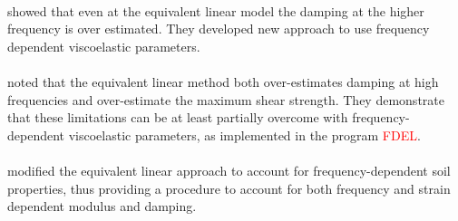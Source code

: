 \\
\citet{Kausel2002} showed that even at the equivalent linear model the damping at the higher frequency is over estimated. They developed new approach to use frequency dependent viscoelastic parameters.\\
\\
\citet{Yoshida2002} noted that the equivalent linear method both over-estimates damping at high frequencies and over-estimate the maximum shear strength. They demonstrate that these limitations can be at least partially overcome with frequency-dependent viscoelastic parameters, as implemented in the program \textcolor{red}{FDEL}.\\
\\
\citet{Park2008} modified the equivalent linear approach to account for frequency-dependent soil properties, thus providing a procedure to account for both frequency and strain dependent modulus and damping.\\
\\


  






